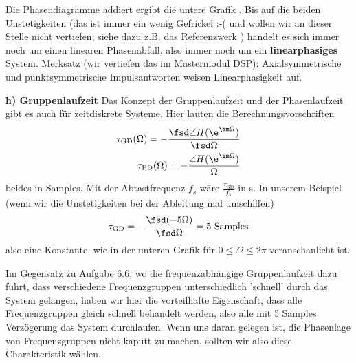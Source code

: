 Die Phasendiagramme addiert ergibt die untere Grafik
. Bis auf die beiden Unstetigkeiten
(das ist immer ein wenig Gefrickel :-( und wollen wir an dieser
Stelle nicht vertiefen; siehe dazu z.B. das Referenzwerk
\cite{Oppenheim2010, Oppenheim2004})
handelt es sich immer noch um einen linearen Phasenabfall, also immer
noch um ein \textbf{linearphasiges} System.
%
Merksatz (wir vertiefen das im Mastermodul DSP): Axialsymmetrische und
punktsymmetrische Impulsantworten weisen Linearphasigkeit auf.

\textbf{h) Gruppenlaufzeit}
Das Konzept der Gruppenlaufzeit und der Phasenlaufzeit
gibt es auch für zeitdiskrete Systeme.
Hier lauten die Berechnungsvorschriften
\begin{align}
\tau_\text{GD}(\Omega) = -\frac{\fsd \angle H(\e^{\im \Omega})}{\fsd \Omega}\\
\tau_\text{PD}(\Omega) = -\frac{\angle H(\e^{\im \Omega})}{\Omega}
\end{align}
beides in Samples. Mit der Abtastfrequenz $f_s$ wäre
$\frac{\tau_\text{GD}}{f_s}$ in s.
%
In unserem Beispiel (wenn wir die Unstetigkeiten bei der Ableitung mal umschiffen)
\begin{align}
\tau_\text{GD} = -\frac{\fsd (-5 \Omega)}{\fsd \Omega} = 5\text{ Samples}\\
\end{align}
also eine Konstante, wie in der unteren Grafik für $0\leq \Omega \leq 2 \pi$
veranschaulicht ist.
\begin{center}
\end{center}
%
Im Gegensatz zu Aufgabe 6.6, wo die frequenzabhängige Gruppenlaufzeit dazu führt,
dass verschiedene Frequenzgruppen unterschiedlich 'schnell' durch das System gelangen,
haben wir hier die vorteilhafte Eigenschaft, dass alle Frequenzgruppen
gleich schnell behandelt werden, also alle mit 5 Samples Verzögerung das
System durchlaufen.
Wenn uns daran gelegen ist, die Phasenlage von Frequenzgruppen nicht kaputt
zu machen, sollten wir also diese Charakteristik wählen.
%

